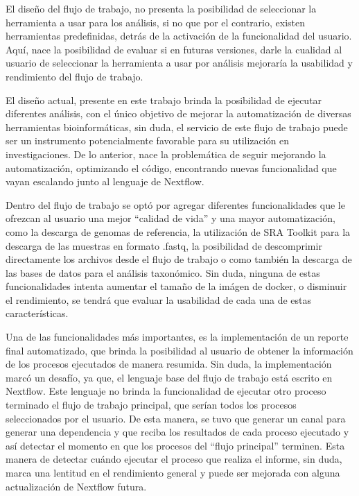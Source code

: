 \documentclass[12pt]{article}
\begin{document}
El diseño del flujo de trabajo, no presenta la posibilidad de seleccionar la 
herramienta a usar para los análisis, si no que por el contrario, existen 
herramientas predefinidas, detrás de la activación de la funcionalidad del usuario. 
Aquí, nace la posibilidad  de evaluar si en futuras versiones, darle la 
cualidad al usuario de seleccionar la herramienta a usar por análisis mejoraría 
la usabilidad y rendimiento del flujo de trabajo. 

El diseño actual, presente en este trabajo brinda la posibilidad de 
ejecutar diferentes análisis, con el único objetivo de mejorar la automatización de 
diversas herramientas bioinformáticas, sin duda, el servicio de este flujo de trabajo 
puede ser un instrumento potencialmente favorable para su utilización en 
investigaciones. De lo anterior, nace la problemática de seguir mejorando la 
automatización, optimizando el código, encontrando nuevas funcionalidad que vayan 
escalando junto al lenguaje de Nextflow.

Dentro del flujo de trabajo se optó por agregar diferentes funcionalidades que le 
ofrezcan al usuario una mejor “calidad de vida” y una mayor automatización, como la 
descarga de genomas de referencia, la utilización de SRA Toolkit para la descarga de 
las muestras en formato .fastq, la posibilidad de descomprimir directamente los 
archivos desde el flujo de trabajo o como también la descarga de las bases de datos 
para el análisis taxonómico. Sin duda, ninguna de estas funcionalidades intenta 
aumentar el tamaño de la imágen de docker, o disminuir el rendimiento, se tendrá que 
evaluar la usabilidad de cada una de estas características.

Una de las funcionalidades más importantes, es la implementación de un reporte 
final automatizado, que brinda la posibilidad al usuario de obtener la información 
de los procesos ejecutados de manera resumida. Sin duda, la implementación marcó un 
desafío, ya que, el lenguaje base del flujo de trabajo está escrito en Nextflow. Este 
lenguaje no brinda la funcionalidad de ejecutar otro proceso terminado el flujo de 
trabajo principal, que serían todos los procesos seleccionados por el usuario. De esta 
manera, se tuvo que generar un canal para generar una dependencia y que reciba los 
resultados de cada proceso ejecutado y así detectar el momento en que los procesos del 
“flujo principal” terminen. Esta manera de detectar cuándo ejecutar el proceso que 
realiza el informe, sin duda, marca una lentitud en el rendimiento general y puede 
ser mejorada con alguna actualización de Nextflow futura.
\end{document}
